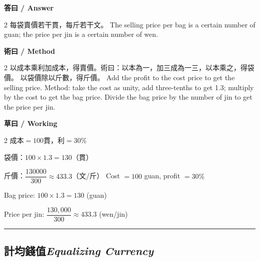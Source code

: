 \documentclass[11pt,a4paper]{article}
\newcommand{\bilingualsubsection}[2]{\subsection{#1\quad\textit{#2}}}
\newcommand{\longline}{\noindent\rule{\textwidth}{0.4pt}}
\begin{document}
\vspace{0.4em}
\noindent\textbf{\textcolor{chinesecolor}{答曰} / \textcolor{englishcolor}{Answer}}
\vspace{0.2em}
\begin{paracol}{2}
每袋賣價若干貫，每斤若干文。
\switchcolumn
The selling price per bag is a certain number of guan; the price per jin is
a certain number of wen.
\end{paracol}

\vspace{0.4em}
\noindent\textbf{\textcolor{chinesecolor}{術曰} / \textcolor{englishcolor}{Method}}
\vspace{0.2em}
\begin{paracol}{2}
以成本乘利加成本，得賣價。術曰：以本為一，加三成為一三，以本乘之，得袋價。
以袋價除以斤數，得斤價。
\switchcolumn
Add the profit to the cost price to get the selling price. Method: take the
cost as unity, add three-tenths to get 1.3; multiply by the cost to get the
bag price. Divide the bag price by the number of jin to get the price per jin.
\end{paracol}

\vspace{0.4em}
\noindent\textbf{\textcolor{chinesecolor}{草曰} / \textcolor{englishcolor}{Working}}
\vspace{0.2em}
\begin{paracol}{2}
成本$=100$貫，利$=30\%$

袋價：$100 \times 1.3 = 130$（貫）

斤價：$\dfrac{130000}{300} \approx 433.3$（文/斤）
\switchcolumn
Cost $= 100$ guan, profit $= 30\%$

Bag price: $100 \times 1.3 = 130$ (guan)

Price per jin: $\dfrac{130{,}000}{300} \approx 433.3$ (wen/jin)
\end{paracol}

\vspace{0.5em}
\longline

\bilingualsubsection{計均錢值}{Equalizing Currency}
\end{document}
